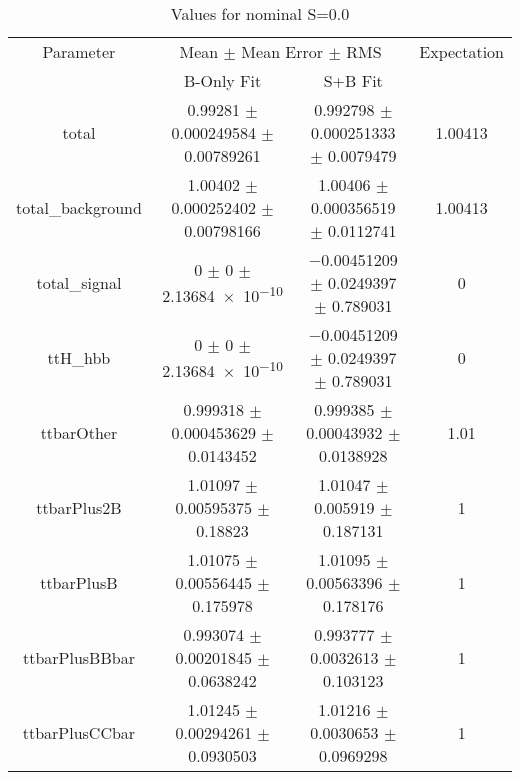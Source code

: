 \begin{table}
\centering
\caption{Values for nominal S=0.0}
\begin{tabular}{cccc}
\toprule
Parameter & \multicolumn{2}{c}{Mean $\pm$ Mean Error $\pm$ RMS} & Expectation\\
 & B-Only Fit & S+B Fit & \\
\midrule
total & \num{0.99281} $\pm$ \num{0.000249584} $\pm$ \num{0.00789261} & \num{0.992798} $\pm$ \num{0.000251333} $\pm$ \num{0.0079479} & \num{1.00413}\\
total\_background & \num{1.00402} $\pm$ \num{0.000252402} $\pm$ \num{0.00798166} & \num{1.00406} $\pm$ \num{0.000356519} $\pm$ \num{0.0112741} & \num{1.00413}\\
total\_signal & \num{0} $\pm$ \num{0} $\pm$ \num{2.13684e-10} & \num{-0.00451209} $\pm$ \num{0.0249397} $\pm$ \num{0.789031} & \num{0}\\
ttH\_hbb & \num{0} $\pm$ \num{0} $\pm$ \num{2.13684e-10} & \num{-0.00451209} $\pm$ \num{0.0249397} $\pm$ \num{0.789031} & \num{0}\\
ttbarOther & \num{0.999318} $\pm$ \num{0.000453629} $\pm$ \num{0.0143452} & \num{0.999385} $\pm$ \num{0.00043932} $\pm$ \num{0.0138928} & \num{1.01}\\
ttbarPlus2B & \num{1.01097} $\pm$ \num{0.00595375} $\pm$ \num{0.18823} & \num{1.01047} $\pm$ \num{0.005919} $\pm$ \num{0.187131} & \num{1}\\
ttbarPlusB & \num{1.01075} $\pm$ \num{0.00556445} $\pm$ \num{0.175978} & \num{1.01095} $\pm$ \num{0.00563396} $\pm$ \num{0.178176} & \num{1}\\
ttbarPlusBBbar & \num{0.993074} $\pm$ \num{0.00201845} $\pm$ \num{0.0638242} & \num{0.993777} $\pm$ \num{0.0032613} $\pm$ \num{0.103123} & \num{1}\\
ttbarPlusCCbar & \num{1.01245} $\pm$ \num{0.00294261} $\pm$ \num{0.0930503} & \num{1.01216} $\pm$ \num{0.0030653} $\pm$ \num{0.0969298} & \num{1}\\
\bottomrule
\end{tabular}
\end{table}